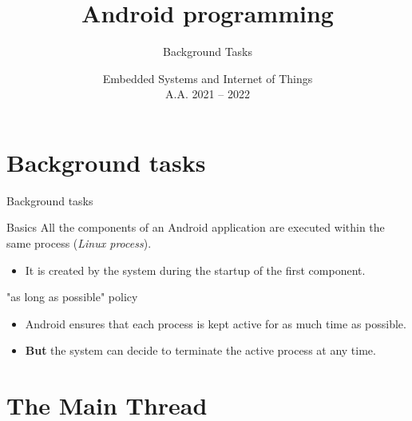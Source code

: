 \documentclass{beamer}
\title[Android -- 1C -- Background tasks]{Android programming}
\subtitle{Background Tasks}
\date[ver. 1.0 (20220505)]{Embedded Systems and Internet of Things\\A.A. 2021 -- 2022}
\begin{document}
\begin{frame}
  \titlepage
\end{frame}



\section{Background tasks}

\begin{frame}{Background tasks}
  \begin{block}{Basics}
    All the components of an Android application are executed within the same
    process (\textit{Linux process}).
    \begin{itemize}
      \item It is created by the system during the startup of the first
      component.
    \end{itemize}
  \end{block}
  \begin{block}{"as long as possible" policy}
    \begin{itemize}
      \item Android ensures that each process is kept active for as much time as
      possible.
      \item \textbf{But} the system can decide to terminate the active process
      at any time.
    \end{itemize}
  \end{block}
\end{frame}

\section{The Main Thread}
\end{document}
